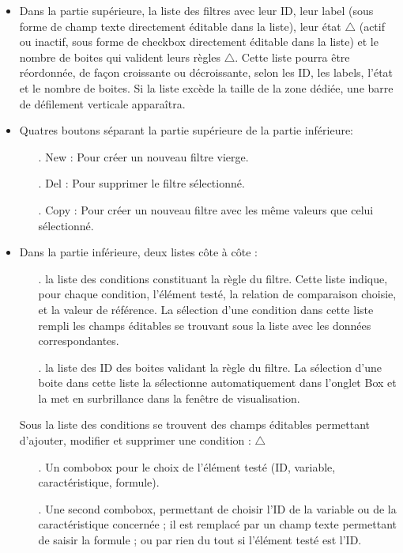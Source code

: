 \documentclass[a4paper]{article}
\begin{document}
\begin{itemize}
\item Dans la partie supérieure, la liste des filtres avec leur ID, leur label (sous forme de champ texte directement éditable dans la liste), leur état $\triangle$ (actif ou inactif, sous forme de checkbox directement éditable dans la liste) et le nombre de boites qui valident leurs règles $\triangle$. Cette liste pourra être réordonnée, de façon croissante ou décroissante, selon les ID, les labels, l'état et le nombre de boites. Si la liste excède la taille de la zone dédiée, une barre de défilement verticale apparaîtra.
\item Quatres boutons séparant la partie supérieure de la partie inférieure:
  \begin{itemize} 
  \item[.] New : Pour créer un nouveau filtre vierge.
  \item[.] Del : Pour supprimer le filtre sélectionné.
  \item[.] Copy : Pour créer un nouveau filtre avec les même valeurs que celui sélectionné.
  \end{itemize}
\item Dans la partie inférieure, deux listes côte à côte :
  \begin{itemize}
  \item[.] la liste des conditions constituant la règle du filtre. Cette liste indique, pour chaque condition, l'élément testé, la relation de comparaison choisie, et la valeur de référence. La sélection d'une condition dans cette liste rempli les champs éditables se trouvant sous la liste avec les données correspondantes.
  \item[.] la liste des ID des boites validant la règle du filtre. La sélection d'une boite dans cette liste la sélectionne automatiquement dans l'onglet Box et la met en surbrillance dans la fenêtre de visualisation.
  \end{itemize}
  Sous la liste des conditions se trouvent des champs éditables permettant d'ajouter, modifier et supprimer une condition : $\triangle$
  \begin{itemize}
  \item[.] Un combobox pour le choix de l'élément testé (ID, variable, caractéristique, formule).
  \item[.] Une second combobox, permettant de choisir l'ID de la variable ou de la caractéristique concernée ; il est remplacé par un champ texte permettant de saisir la formule ; ou par rien du tout si l'élément testé est l'ID.

\end{itemize}
\end{itemize}
\end{document}
